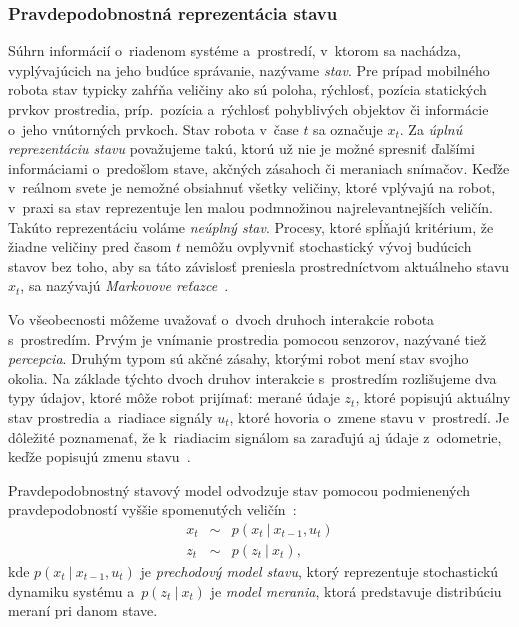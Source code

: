    \subsubsection{Pravdepodobnostná reprezentácia stavu}
      
      Súhrn informácií o~riadenom systéme a~prostredí, v~ktorom sa nachádza, vyplývajúcich na jeho budúce správanie, nazývame \emph{stav}. Pre prípad mobilného robota stav typicky zahŕňa veličiny ako sú poloha, rýchlosť, pozícia statických prvkov prostredia, príp.\ pozícia a~rýchlosť pohyblivých objektov či informácie o~jeho vnútorných prvkoch. Stav robota v~čase $t$ sa označuje $x_t$. Za \emph{úplnú reprezentáciu stavu} považujeme takú, ktorú už nie je možné spresniť ďalšími informáciami o~predošlom stave, akčných zásahoch či meraniach snímačov. Keďže v~reálnom svete je nemožné obsiahnuť všetky veličiny, ktoré vplývajú na robot, v~praxi sa stav reprezentuje len malou podmnožinou najrelevantnejších veličín. Takúto reprezentáciu voláme \emph{neúplný stav}. Procesy, ktoré spĺňajú kritérium, že žiadne veličiny pred časom $t$ nemôžu ovplyvniť stochastický vývoj budúcich stavov bez toho, aby sa táto závislosť preniesla prostredníctvom aktuálneho stavu $x_t$, sa nazývajú \emph{Markovove reťazce}~\cite{thrunProbabilisticRobotics2005}.

      Vo všeobecnosti môžeme uvažovať o~dvoch druhoch interakcie robota s~prostredím. Prvým je vnímanie prostredia pomocou senzorov, nazývané tiež \emph{percepcia}. Druhým typom sú akčné zásahy, ktorými robot mení stav svojho okolia. Na základe týchto dvoch druhov interakcie s~prostredím rozlišujeme dva typy údajov, ktoré môže robot prijímať: merané údaje $z_t$, ktoré popisujú aktuálny stav prostredia a~riadiace signály $u_t$, ktoré hovoria o~zmene stavu v~prostredí. Je dôležité poznamenať, že k~riadiacim signálom sa zaraďujú aj údaje z~odometrie, keďže popisujú zmenu stavu~\cite{thrunProbabilisticRobotics2005}.

      Pravdepodobnostný stavový model odvodzuje stav pomocou podmienených pravdepodobností vyššie spomenutých veličín~\cite{thrunProbabilisticRobotics2005, sarkkaBayesianFilteringSmoothing2013}:
      \begin{eqnarray*}
        x_t &\sim& p(x_t\ |\ x_{t-1}, u_t) \\
        z_t &\sim& p(z_t\ |\ x_t),
      \end{eqnarray*}
      kde $p(x_t\ |\ x_{t-1}, u_t)$ je \emph{prechodový model stavu}, ktorý reprezentuje stochastickú dynamiku systému a~$p(z_t\ |\ x_t)$ je \emph{model merania}, ktorá predstavuje distribúciu meraní pri danom stave.


